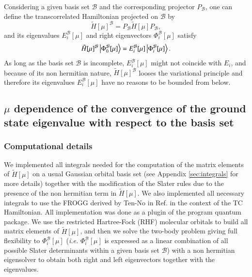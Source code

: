 \documentclass[aip,jcp,reprint,noshowkeys,superscriptaddress,twocolumn]{revtex4-1}
\newcommand{\phimub}[0]{\Phi^{\mathcal{B}}_0[\mu]}
\newcommand{\phiimub}[0]{\Phi^{\mathcal{B}}_i[\mu]}
\newcommand{\basis}[0]{\mathcal{B}}
\begin{document}
Considering a given basis set $\basis$ and the corresponding projector $P_\basis$, one can define the transcorrelated Hamiltonian projected on $\basis$ by
\begin{equation}
 \tilde{H}[\mu]^{\basis} = P_\basis \tilde{H}[\mu] P_\basis,
\end{equation}
and its eigenvalues $E_i^{\basis}[\mu]$ and right eigenvectors $\phiimub$ satisfy 
\begin{equation}
 \tilde{H}[\mu]^{\basis} \ket{\phimub} = E_i^{\basis}[\mu] \ket{\phiimub}. 
\end{equation}
As long as the basis set $\basis$ is incomplete, $E_i^{\basis}[\mu]$ might not coincide with $E_i$, and because of its non hermitian nature, $\tilde{H}[\mu]^{\basis}$ looses the variational principle and therefore its eigenvalues $E_i^{\basis}[\mu]$ have no reasons to be bounded from below.  

\subsection{$\mu$ dependence of the convergence of the ground state eigenvalue with respect to the basis set }
\subsubsection{Computational details}
We implemented all integrals needed for the computation of the matrix elements of $\tilde{H}[\mu]$ on a usual Gaussian orbital basis set (see Appendix \ref{sec:integrals} for more details) together with the modification of the Slater rules due to the presence of the non hermitian term in $\tilde{H}[\mu]$. We also implemented all necessary integrals to use the FROGG derived by Ten-No in Ref.  in the context of the TC Hamiltonian.  
All implementation was done as a plugin of the program quantum package\cite{QP2}. 
We use the restricted Hartree-Fock (RHF) molecular orbitals to build all matrix elements of $\tilde{H}[\mu]$, and then we solve the two-body problem giving full flexibility to $\phiimub$ (\textit{i.e.} $\phiimub$ is expressed as a linear combination of all possible Slater determinants within a given basis set $\basis$) with a non hermitian eigensolver to obtain both right and left eigenvectors together with the eigenvalues. 
\end{document}
